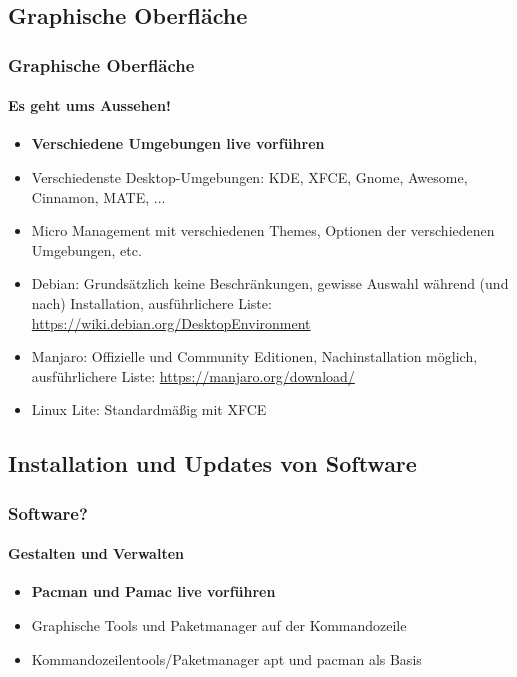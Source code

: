 \documentclass[9pt]{beamer}
\begin{document}
\subsection{Graphische Oberfläche}
\begin{frame}
 \frametitle{Graphische Oberfläche}
 \framesubtitle{Es geht ums Aussehen!}
 \begin{Large}
 \begin{itemize}
  \item \textbf{Verschiedene Umgebungen live vorführen}
  \item Verschiedenste Desktop-Umgebungen: KDE, XFCE, Gnome, Awesome, Cinnamon, MATE, ...
  \item Micro Management mit verschiedenen Themes, Optionen der verschiedenen Umgebungen, etc.
  \item Debian: Grundsätzlich keine Beschränkungen, gewisse Auswahl während (und nach) Installation, ausführlichere Liste: \href{https://wiki.debian.org/DesktopEnvironment}{https://wiki.debian.org/DesktopEnvironment}
  \item Manjaro: Offizielle und Community Editionen, Nachinstallation möglich, ausführlichere Liste: \href{https://manjaro.org/download/}{https://manjaro.org/download/}
  \item Linux Lite: Standardmäßig mit XFCE
 \end{itemize}
 \end{Large}
\end{frame}

\subsection{Installation und Updates von Software}

\begin{frame}
 \frametitle{Software?}
 \framesubtitle{Gestalten und Verwalten}
 \begin{Large}
 \begin{itemize}
  \item \textbf{Pacman und Pamac live vorführen}
  \item Graphische Tools und Paketmanager auf der Kommandozeile
  \item Kommandozeilentools/Paketmanager apt und pacman als Basis
 \end{itemize}
  \end{Large}
\end{frame}
\end{document}
